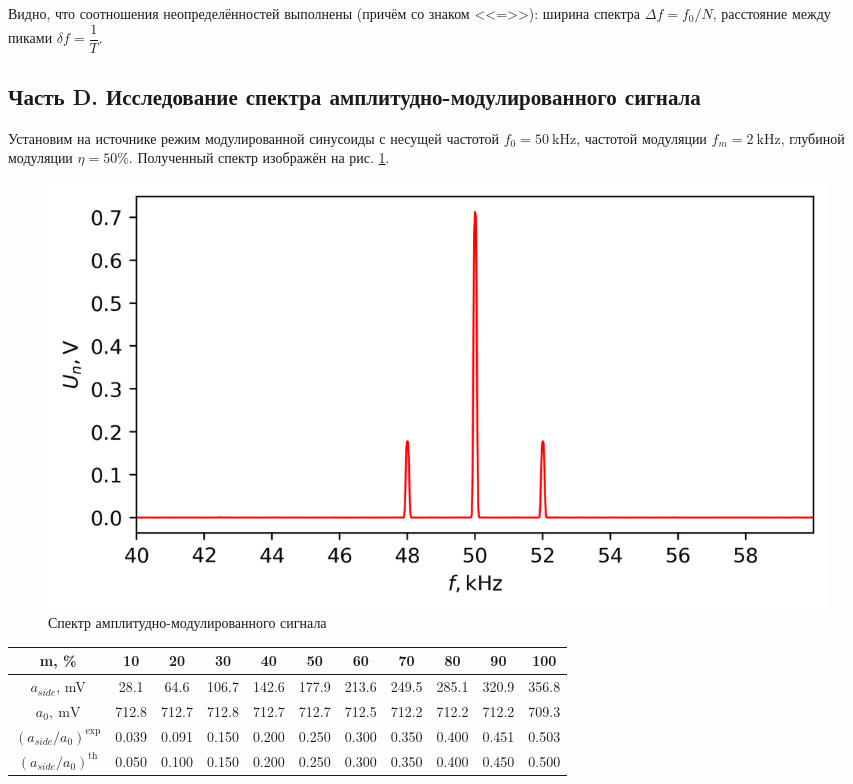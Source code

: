 \documentclass[12pt, a4paper]{article}
\newcommand{\kHz}{~\mathrm{kHz}}
\begin{document}
Видно, что соотношения неопределённостей выполнены (причём со знаком <<=>>): ширина спектра $\Delta f = f_0 / N$, расстояние между пиками $\delta f = \dfrac{1}{T}$.

\subsection{Часть D. Исследование спектра амплитудно-модулированного сигнала}
Установим на источнике режим модулированной синусоиды с несущей частотой $f_0 = 50\kHz$, частотой модуляции $f_m = 2\kHz$, глубиной модуляции $\eta = 50\%$. Полученный спектр изображён на рис. \ref{am}.

\begin{figure}[H]
  \centering
  \includegraphics[width = 0.8\linewidth]{pics/am}
  \caption{Спектр амплитудно-модулированного сигнала}
  \label{am}
\end{figure}

\begin{table}[h!]
  \centering
  \begin{tabular}{|c|c|c|c|c|c|c|c|c|c|c|}
    \hline m, \% & 10 & 20& 30& 40& 50& 60& 70 & 80 &90 &100\\ \hline
    $a_{side}$, mV & 28.1 & 64.6& 106.7   &142.6& 177.9& 213.6& 249.5& 285.1&320.9&356.8\\ \hline
    $a_0,~\mathrm{mV}$ & 712.8 & 712.7& 712.8& 712.7& 712.7& 712.5& 712.2& 712.2&712.2&709.3\\ \hline
    $(a_{side}/a_0)^\text{exp}$ & 0.039& 0.091& 0.150& 0.200& 0.250& 0.300& 0.350& 0.400&0.451&0.503\\ \hline
    $(a_{side}/a_0)^\text{th}$ & 0.050 & 0.100 & 0.150 & 0.200 & 0.250 & 0.300 & 0.350 & 0.400 & 0.450 & 0.500 \\ \hline
  \end{tabular}
  \label{amdata}
\end{table}
\end{document}
